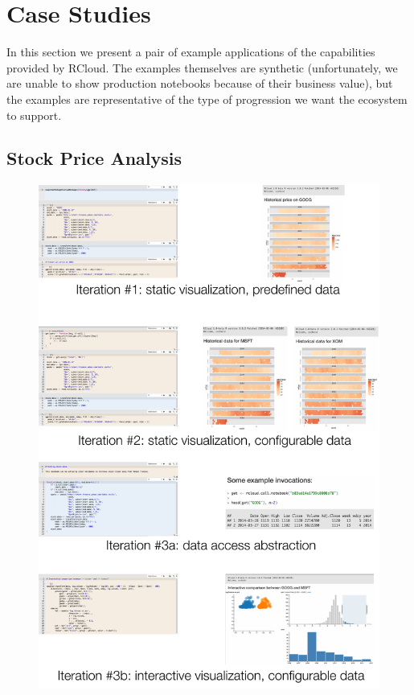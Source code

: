 \section{Case Studies}

In this section we present a pair of example applications of the
capabilities provided by RCloud. The examples themselves are synthetic
(unfortunately, we are unable to show production notebooks because of
their business value), but the examples are representative of the
type of progression we want the ecosystem to support.

\subsection{Stock Price Analysis\label{sec:stockvis}}

\begin{figure}
\includegraphics[width=\linewidth]{fig/casestudy1/casestudy1.pdf}

\end{figure}
